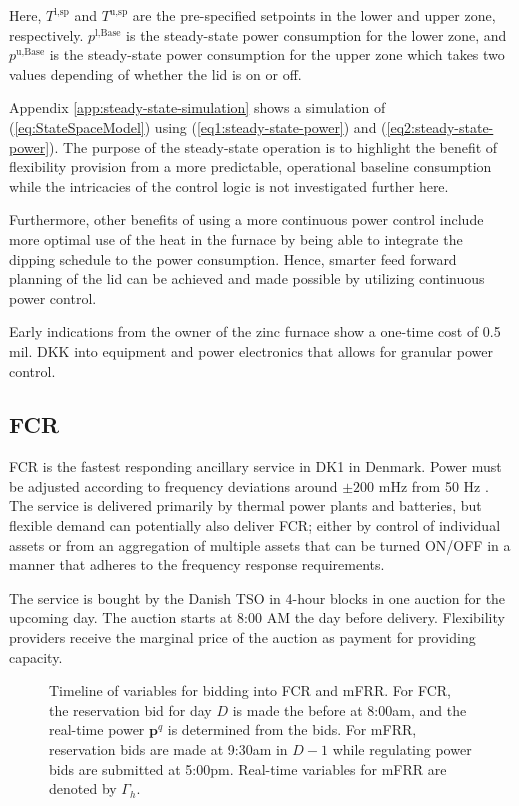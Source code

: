 \documentclass[sigconf]{acmart}
\begin{document}
Here, $T^{\text{l},\text{sp}}$ and $T^{\text{u},\text{sp}}$ are the pre-specified setpoints in the lower and upper zone, respectively. $p^{\text{l},\text{Base}}$ is the steady-state power consumption for the lower zone, and $p^{\text{u},\text{Base}}$ is the steady-state power consumption for the upper zone which takes two values depending of whether the lid is on or off.

Appendix \ref{app:steady-state-simulation} shows a simulation of (\ref{eq:StateSpaceModel}) using (\ref{eq1:steady-state-power}) and (\ref{eq2:steady-state-power}). The purpose of the steady-state operation is to highlight the benefit of flexibility provision from a more predictable, operational baseline consumption while the intricacies of the control logic is not investigated further here.

Furthermore, other benefits of using a more continuous power control include more optimal use of the heat in the furnace by being able to integrate the dipping schedule to the power consumption. Hence, smarter feed forward planning of the lid can be achieved and made possible by utilizing continuous power control.

Early indications from the owner of the zinc furnace show a one-time cost of 0.5 mil. DKK into equipment and power electronics that allows for granular power control.

\subsection{FCR}

FCR is the fastest responding ancillary service in DK1 in Denmark. Power must be adjusted according to frequency deviations around $\pm 200$ mHz from 50 Hz \cite{energinet:prequalification}. The service is delivered primarily by thermal power plants and batteries, but flexible demand can potentially also deliver FCR; either by control of individual assets or from an aggregation of multiple assets that can be turned ON/OFF in a manner that adheres to the frequency response requirements.

The service is bought by the Danish TSO in 4-hour blocks in one auction for the upcoming day. The auction starts at 8:00 AM the day before delivery. Flexibility providers receive the marginal price of the auction as payment for providing capacity.

\begin{figure}\label{fig:timeline}
    \begin{adjustbox}{width=\columnwidth}
        
    \end{adjustbox}
    \caption{Timeline of variables for bidding into FCR and mFRR. For FCR, the reservation bid for day $D$ is made the before at 8:00am, and the real-time power $\bm{p}^{q}$ is determined from the bids. For mFRR, reservation bids are made at 9:30am in $D-1$ while regulating power bids are submitted at 5:00pm. Real-time variables for mFRR are denoted by $\Gamma_{h}$.}
\end{figure}
\end{document}
